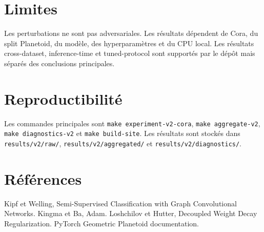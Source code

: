 \documentclass[11pt,a4paper]{article}
\begin{document}
\section{Limites}
Les perturbations ne sont pas adversariales. Les résultats dépendent de Cora, du split Planetoid, du modèle, des hyperparamètres et du CPU local. Les résultats cross-dataset, inference-time et tuned-protocol sont supportés par le dépôt mais séparés des conclusions principales.

\section{Reproductibilité}
Les commandes principales sont \texttt{make experiment-v2-cora}, \texttt{make aggregate-v2}, \texttt{make diagnostics-v2} et \texttt{make build-site}. Les résultats sont stockés dans \texttt{results/v2/raw/}, \texttt{results/v2/aggregated/} et \texttt{results/v2/diagnostics/}.

\section{Références}
Kipf et Welling, Semi-Supervised Classification with Graph Convolutional Networks. Kingma et Ba, Adam. Loshchilov et Hutter, Decoupled Weight Decay Regularization. PyTorch Geometric Planetoid documentation.
\end{document}
